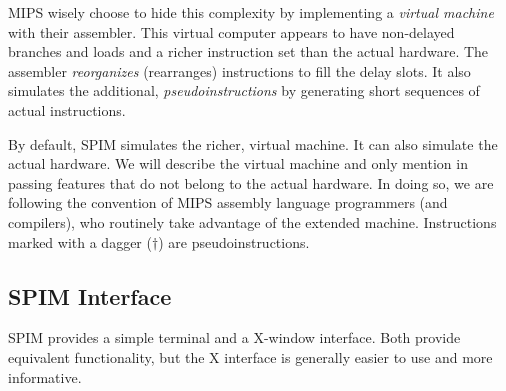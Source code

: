\documentclass[11pt]{article}
\begin{document}
MIPS wisely choose to hide this complexity by implementing a {\em
virtual machine\/} with their assembler.  This virtual computer
appears to have non-delayed branches and loads and a richer
instruction set than the actual hardware.  The assembler {\em
reorganizes\/} (rearranges) instructions to fill the delay slots.  It
also simulates the additional, {\em pseudoinstructions\/} by
generating short sequences of actual instructions.

By default, SPIM simulates the richer, virtual machine.  It can also
simulate the actual hardware.  We will describe the virtual machine
and only mention in passing features that do not belong to the actual
hardware.  In doing so, we are following the convention of MIPS
assembly language programmers (and compilers), who routinely take
advantage of the extended machine.  Instructions marked with a dagger
($\dagger$) are pseudoinstructions.

\subsection{SPIM Interface}

SPIM provides a simple terminal and a X-window interface.  Both
provide equivalent functionality, but the X interface is generally
easier to use and more informative.
\end{document}
